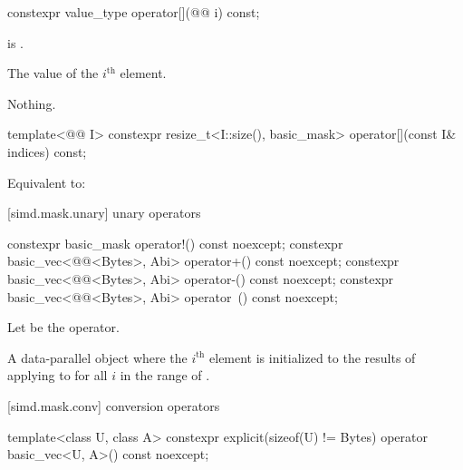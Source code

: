 \begin{itemdecl}
constexpr value_type operator[](@@ i) const;
\end{itemdecl}

\begin{itemdescr}
\pnum
\expects
{} is .

\pnum
\returns
The value of the $i^\text{th}$ element.

\pnum
\throws
Nothing.
\end{itemdescr}

\begin{itemdecl}
template<@@ I>
  constexpr resize_t<I::size(), basic_mask> operator[](const I& indices) const;
\end{itemdecl}

\begin{itemdescr}
\pnum
\effects
Equivalent to: 
\end{itemdescr}

[simd.mask.unary]{ unary operators}

\begin{itemdecl}
constexpr basic_mask operator!() const noexcept;
constexpr basic_vec<@@<Bytes>, Abi> operator+() const noexcept;
constexpr basic_vec<@@<Bytes>, Abi> operator-() const noexcept;
constexpr basic_vec<@@<Bytes>, Abi> operator~() const noexcept;
\end{itemdecl}

\begin{itemdescr}
\pnum
Let  be the operator.

\pnum
\returns
A data-parallel object where the $i^\text{th}$ element is initialized to the
results of applying  to  for all $i$ in
the range of .
\end{itemdescr}

[simd.mask.conv]{ conversion operators}

\begin{itemdecl}
template<class U, class A>
  constexpr explicit(sizeof(U) != Bytes) operator basic_vec<U, A>() const noexcept;
\end{itemdecl}

